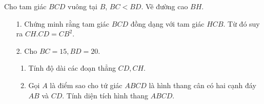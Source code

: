 \begin{ex}%
    Cho tam giác $BCD$ vuông tại $B$, $BC<BD$. Vẽ đường cao $BH$.
    \begin{enumerate}
        \item[1.] Chứng minh rằng tam giác $BCD$ đồng dạng với tam giác $HCB$. Từ đó suy ra $CH.CD=CB^2$.
        \item[2.] Cho $BC=15,BD=20$.
        \begin{enumerate}
        	\item Tính độ dài các đoạn thẳng $CD,CH$.
        	\item Gọi $A$ là điểm sao cho tứ giác $ABCD$ là hình thang cân có hai cạnh đáy $AB$ và $CD$. Tính diện tích hình thang $ABCD$.
        \end{enumerate}
    \end{enumerate}
\loigiai
    {
    \begin{center}
\end{center}}
\end{ex}
